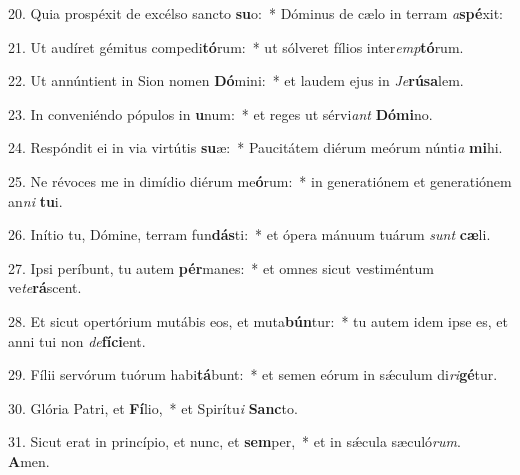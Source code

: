 20. Quia prospéxit de excélso sancto \textbf{su}o:~*  Dóminus de cælo in terram \textit{a}\textbf{spé}xit:\

21. Ut audíret gémitus compedi\textbf{tó}rum:~*  ut sólveret fílios inter\textit{emp}\textbf{tó}rum.\

22. Ut annúntient in Sion nomen \textbf{Dó}mini:~*  et laudem ejus in \textit{Je}\textbf{rú}\textbf{sa}lem.\

23. In conveniéndo pópulos in \textbf{u}num:~*  et reges ut sérvi\textit{ant} \textbf{Dó}\textbf{mi}no.\

24. Respóndit ei in via virtútis \textbf{su}æ:~*  Paucitátem diérum meórum núnti\textit{a} \textbf{mi}hi.\

25. Ne révoces me in dimídio diérum me\textbf{ó}rum:~*  in generatiónem et generatiónem an\textit{ni} \textbf{tu}i.\

26. Inítio tu, Dómine, terram fun\textbf{dás}ti:~*  et ópera mánuum tuárum \textit{sunt} \textbf{cæ}li.\

27. Ipsi períbunt, tu autem \textbf{pér}manes:~*  et omnes sicut vestiméntum ve\textit{te}\textbf{rá}scent.\

28. Et sicut opertórium mutábis eos, et muta\textbf{bún}tur:~*  tu autem idem ipse es, et anni tui non \textit{de}\textbf{fí}\textbf{ci}ent.\

29. Fílii servórum tuórum habi\textbf{tá}bunt:~*  et semen eórum in sǽculum di\textit{ri}\textbf{gé}tur.\

30. Glória Patri, et \textbf{Fí}lio,~*  et Spirítu\textit{i} \textbf{Sanc}to.\

31. Sicut erat in princípio, et nunc, et \textbf{sem}per,~*  et in sǽcula sæculó\textit{rum}. \textbf{A}men.\

